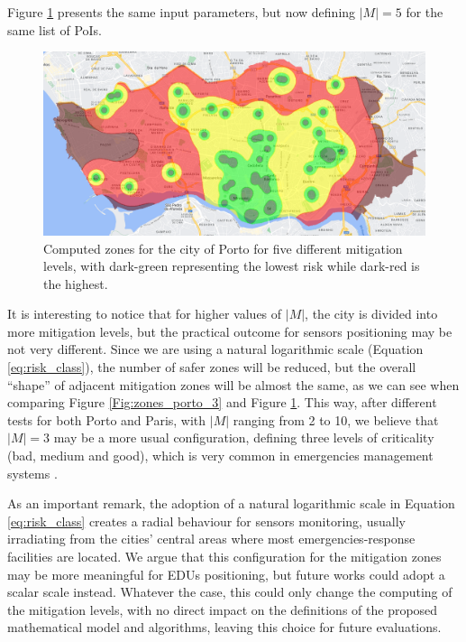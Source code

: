 \begin{refsection}
Figure \ref{Fig:zones_porto_5} presents the same input parameters, but now defining $|M|=5$ for the same list of PoIs.

\begin{figure}[ht!]
  \centering
  \includegraphics[width=0.9\linewidth]{Chapters/2-EDUs/images/porto_M5_no_weight.png}
  \caption{Computed zones for the city of Porto for five different mitigation levels, with dark-green representing the lowest risk while dark-red is the highest.}\label{Fig:zones_porto_5}
\end{figure}

It is interesting to notice that for higher values of $|M|$, the city is divided into more mitigation levels, but the practical outcome for sensors positioning may be not very different. Since we are using a natural logarithmic scale (Equation \ref{eq:risk_class}), the number of safer zones will be reduced, but the overall ``shape'' of adjacent mitigation zones will be almost the same, as we can see when comparing Figure \ref{Fig:zones_porto_3} and Figure \ref{Fig:zones_porto_5}. This way, after different tests for both Porto and Paris, with $|M|$ ranging from 2 to 10, we believe that $|M|=3$ may be a more usual configuration, defining three levels of criticality (bad, medium and good), which is very common in emergencies management systems \cite{surveyEmergencies}.

As an important remark, the adoption of a natural logarithmic scale in Equation \ref{eq:risk_class} creates a radial behaviour for sensors monitoring, usually irradiating from the cities' central areas where most emergencies-response facilities are located. We argue that this configuration for the mitigation zones may be more meaningful for EDUs positioning, but future works could adopt a scalar scale instead. Whatever the case, this could only change the computing of the mitigation levels, with no direct impact on the definitions of the proposed mathematical model and algorithms, leaving this choice for future evaluations.


\end{refsection}
